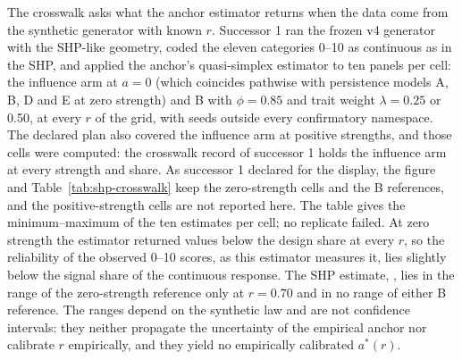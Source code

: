 The crosswalk asks what the anchor estimator returns when the data come from the synthetic generator with known $r$. Successor 1 ran the frozen v4 generator with the SHP-like geometry, coded the eleven categories 0--10 as continuous as in the SHP, and applied the anchor's quasi-simplex estimator to ten panels per cell: the influence arm at $a=0$ (which coincides pathwise with persistence models A, B, D and E at zero strength) and B with $\phi=0.85$ and trait weight $\lambda=0.25$ or 0.50, at every $r$ of the grid, with seeds outside every confirmatory namespace. The declared plan also covered the influence arm at positive strengths, and those cells were computed: the crosswalk record of successor 1 holds the influence arm at every strength and share. As successor 1 declared for the display, the figure and Table~\ref{tab:shp-crosswalk} keep the zero-strength cells and the B references, and the positive-strength cells are not reported here. The table gives the minimum--maximum of the ten estimates per cell; no replicate failed. At zero strength the estimator returned values below the design share at every $r$, so the reliability of the observed 0--10 scores, as this estimator measures it, lies slightly below the signal share of the continuous response. The SHP estimate, , lies in the range of the zero-strength reference only at $r=0.70$ and in no range of either B reference. The ranges depend on the synthetic law and are not confidence intervals: they neither propagate the uncertainty of the empirical anchor nor calibrate $r$ empirically, and they yield no empirically calibrated $a^*(r)$.

